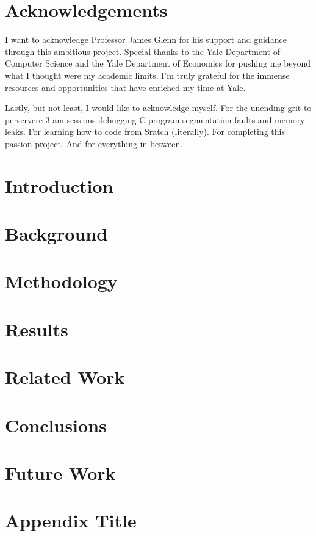 \documentclass[12pt,twoside]{report}
\begin{document}


\chapter*{Acknowledgements}
I want to acknowledge Professor James Glenn for his support and guidance through this ambitious project. Special thanks to the Yale Department of Computer Science and the Yale Department of Economics for pushing me beyond what I thought were my academic limits.
I'm truly grateful for the immense resources and opportunities that have enriched my time at Yale.

Lastly, but not least, I would like to acknowledge myself. For the unending grit to perservere 3 am sessions debugging C program segmentation faults and memory leaks. For learning how to code from \href{https://scratch.mit.edu/}{Sratch} (literally). For completing this passion project.
And for everything in between.
{
  \hypersetup{linkcolor=black}
  \tableofcontents
}

\clearpage




\chapter{Introduction}


\chapter{Background} \label{ch:background}


\chapter{Methodology} \label{ch:methodology}



\chapter{Results} \label{ch:results}


\chapter{Related Work} \label{ch:relatedwork}


\chapter{Conclusions} \label{ch:conclusion}


\chapter{Future Work} \label{ch:futurework}



\printbibliography

\appendix
\chapter{Appendix Title} \label{ch:appendices}
 
\end{document}
